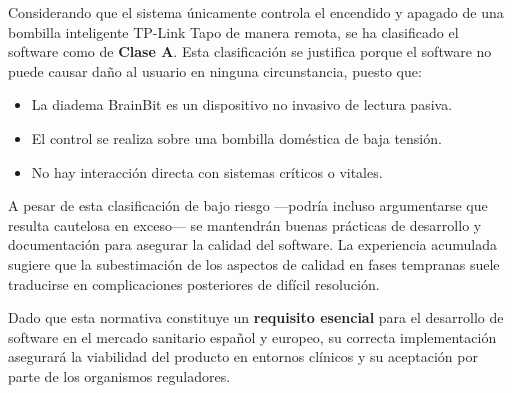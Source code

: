 Considerando que el sistema únicamente controla el encendido y apagado de una bombilla inteligente TP-Link Tapo de manera remota, se ha clasificado el software como de \textbf{Clase A}. Esta clasificación se justifica porque el software no puede causar daño al usuario en ninguna circunstancia, puesto que:
\begin{itemize}
    \item La diadema BrainBit es un dispositivo no invasivo de lectura pasiva.
    \item El control se realiza sobre una bombilla doméstica de baja tensión.
    \item No hay interacción directa con sistemas críticos o vitales.
\end{itemize}

A pesar de esta clasificación de bajo riesgo —podría incluso argumentarse que resulta cautelosa en exceso— se mantendrán buenas prácticas de desarrollo y documentación para asegurar la calidad del software. La experiencia acumulada sugiere que la subestimación de los aspectos de calidad en fases tempranas suele traducirse en complicaciones posteriores de difícil resolución.

Dado que esta normativa constituye un \textbf{requisito esencial} para el desarrollo de software en el mercado sanitario español y europeo, su correcta implementación asegurará la viabilidad del producto en entornos clínicos y su aceptación por parte de los organismos reguladores.
